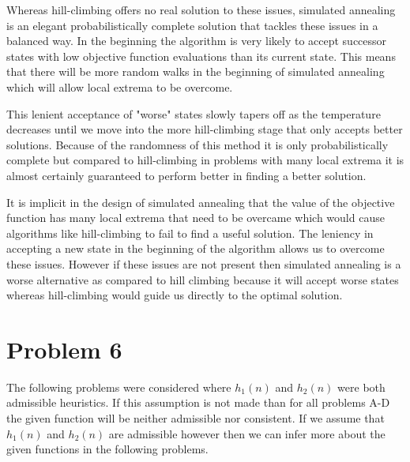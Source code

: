 \documentclass[10pt,a4paper]{article}
\begin{document}
\begin{enumerate}[A.]
		Whereas hill-climbing offers no real solution to these issues, simulated annealing is an elegant probabilistically complete solution that tackles these issues in a balanced way. In the beginning the algorithm is very likely to accept successor states with low objective function evaluations than its current state. This means that there will be more random walks in the beginning of simulated annealing which will allow local extrema to be overcome.
		
		This lenient acceptance of "worse" states slowly tapers off as the temperature decreases until we move into the more hill-climbing stage that only accepts better solutions. Because of the randomness of this method it is only probabilistically complete but compared to hill-climbing in problems with many local extrema it is almost certainly guaranteed to perform better in finding a better solution.
		
		It is implicit in the design of simulated annealing that the value of the objective function has many local extrema that need to be overcame which would cause algorithms like hill-climbing to fail to find a useful solution. The leniency in accepting a new state in the beginning of the algorithm allows us to overcome these issues. However if these issues are not present then simulated annealing is a worse alternative as compared to hill climbing because it will accept worse states whereas hill-climbing would guide us directly to the optimal solution.
		
	\end{enumerate}
	
	\section*{Problem 6}
	
	The following problems were considered where $h_1(n)$ and $h_2(n)$ were both admissible heuristics. If this assumption is not made than for all problems A-D the given function will be neither admissible nor consistent. If we assume that $h_1(n)$ and $h_2(n)$ are admissible however then we can infer more about the given functions in the following problems.
	
\end{document}
